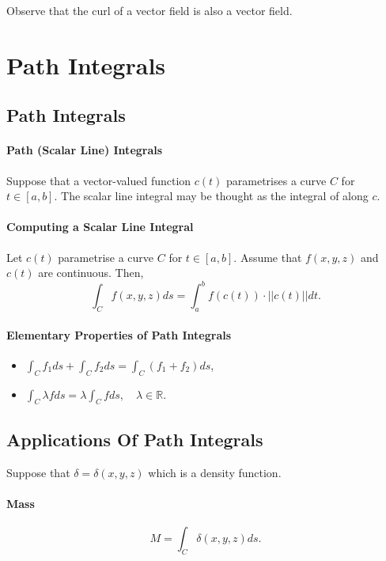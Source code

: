 \documentclass[12pt, letterpaper]{article}
\begin{document}
    Observe that the curl of a vector field is also a vector field.

    
    \section{Path Integrals}

    \subsection{Path Integrals}

    \paragraph{Path (Scalar Line) Integrals}
    Suppose that a vector-valued function \(c(t)\) parametrises a 
    curve \(C\) for \(t\in [a, b]\).
    The scalar line integral may be thought as the integral of along \(c\).

    \paragraph{Computing a Scalar Line Integral}
    Let \(c(t)\) parametrise a curve \(C\) for \(t\in [a, b]\).
    Assume that \(f(x, y, z)\) and \(c(t)\) are continuous.
    Then,
    \[
        \int_{C} f(x, y, z) ds
        =
        \int_{a}^{b} f\left(c\left(t\right)\right) \cdot ||c(t)|| dt.
    \]

    \paragraph{Elementary Properties of Path Integrals}
    \begin{itemize}
        \item \(\int_C f_1 ds + \int_C f_2 ds = \int_C(f_1+f_2)ds\),
        \item \(\int_C\lambda f ds = \lambda \int_C f ds, \quad
        \lambda\in \mathbb{R}\).
    \end{itemize}
    
    \subsection{Applications Of Path Integrals}
    Suppose that \(\delta = \delta(x, y, z)\) which is a density function.

    \paragraph{Mass}
    \[M = \int_C \delta(x, y, z) ds.\]
\end{document}

